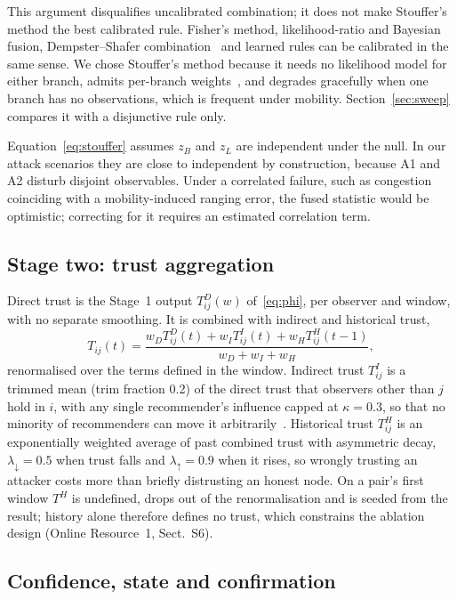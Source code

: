 This argument disqualifies uncalibrated combination; it does not make
Stouffer's method the best calibrated rule. Fisher's method, likelihood-ratio
and Bayesian fusion, Dempster--Shafer combination~\cite{singh2020self} and
learned rules can be calibrated in the same sense. We chose Stouffer's method
because it needs no likelihood model for either branch, admits per-branch
weights~\cite{whitlock2005weighted}, and degrades gracefully when one branch
has no observations, which is frequent under mobility. Section~\ref{sec:sweep}
compares it with a disjunctive rule only.

Equation~\eqref{eq:stouffer} assumes $z_B$ and $z_L$ are independent under the
null. In our attack scenarios they are close to independent by construction,
because A1 and A2 disturb disjoint observables. Under a correlated failure,
such as congestion coinciding with a mobility-induced ranging error, the fused
statistic would be optimistic; correcting for it requires an estimated
correlation term.

\subsection{Stage two: trust aggregation}

Direct trust is the Stage~1 output $T^D_{ij}(w)$ of~\eqref{eq:phi}, per
observer and window, with no separate smoothing. It is combined with indirect
and historical trust,
\begin{equation}
\label{eq:combined}
T_{ij}(t) = \frac{w_D T^D_{ij}(t) + w_I T^I_{ij}(t) + w_H T^H_{ij}(t-1)}{w_D + w_I + w_H},
\end{equation}
renormalised over the terms defined in the window. Indirect trust $T^I_{ij}$ is
a trimmed mean (trim fraction 0.2) of the direct trust that observers other
than $j$ hold in $i$, with any single recommender's influence capped at
$\kappa = 0.3$, so that no minority of recommenders can move it
arbitrarily~\cite{liu2008attack}. Historical trust $T^H_{ij}$ is an
exponentially weighted average of past combined trust with asymmetric decay,
$\lambda_\downarrow = 0.5$ when trust falls and $\lambda_\uparrow = 0.9$ when
it rises, so wrongly trusting an attacker costs more than briefly distrusting
an honest node. On a pair's first window $T^H$ is undefined, drops out of the
renormalisation and is seeded from the result; history alone therefore
defines no trust, which constrains the ablation design (Online Resource~1,
Sect.~S6).

\subsection{Confidence, state and confirmation}

